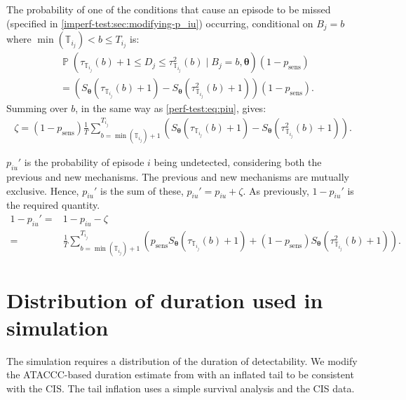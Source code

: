 \documentclass[12pt]{article}
\DeclareMathOperator{\prob}{\mathbb{P}}
\renewcommand{\vec}[1]{\bm{#1}}
\newcommand{\psens}{p_\text{sens}}
\newcommand{\sched}{\mathbb{T}}
\begin{document}
The probability of one of the conditions that cause an episode to be missed (specified in \cref{imperf-test:sec:modifying-p_iu}) occurring, conditional on $B_j = b$ where $\min(\sched_{i_j}) < b \leq T_{i_j}$ is:
\begin{align}
&\prob \left(
    \tau_{\sched_{i_j}}(b) + 1 \leq D_j \leq \tau^2_{\sched_{i_j}}(b)
    \mid B_j = b, \vec{\theta} \right) (1 - \psens) \\
&= \left( S_{\vec{\theta}}(\tau_{\sched_{i_j}}(b) + 1) - S_{\vec{\theta}}(\tau^2_{\sched_{i_j}}(b) + 1) \right) (1 - \psens).
\end{align}
Summing over $b$, in the same way as \cref{perf-test:eq:piu}, gives:
\begin{align}
\zeta = (1 - p_\text{sens})\frac{1}{T} \sum_{b=\min(\sched_{i_j}) + 1}^{T_{i_j}} \left( S_{\vec{\theta}}(\tau_{\sched_{i_j}}(b) + 1) - S_{\vec{\theta}}(\tau^2_{\sched_{i_j}}(b) + 1) \right).
\label{imperf-test:eq:zeta}
\end{align}

$p_{iu}'$ is the probability of episode $i$ being undetected, considering both the previous and new mechanisms.
The previous and new mechanisms are mutually exclusive.
Hence, $p_{iu}'$ is the sum of these, $p_{iu}' = p_{iu} + \zeta$.
As previously, $1 - p_{iu}'$ is the required quantity.
\begin{align}
1 - p_{iu}'
=& 1 - p_{iu} - \zeta \\
=& \frac{1}{T} \sum_{b=\min(\sched_{i_j}) + 1}^{T_{i_j}} \left( p_\text{sens} S_{\vec{\theta}}(\tau_{\sched_{i_j}}(b) + 1) + (1 - p_\text{sens}) S_{\vec{\theta}}(\tau^2_{\sched_{i_j}}(b) + 1)\right).
\end{align}

\section{Distribution of duration used in simulation} \label{sec:simulation-truth}

The simulation requires a distribution of the duration of detectability.
We modify the ATACCC-based duration estimate from \citet[chapter 4]{blakeThesis} with an inflated tail to be consistent with the CIS.
The tail inflation uses a simple survival analysis and the CIS data.
\end{document}
